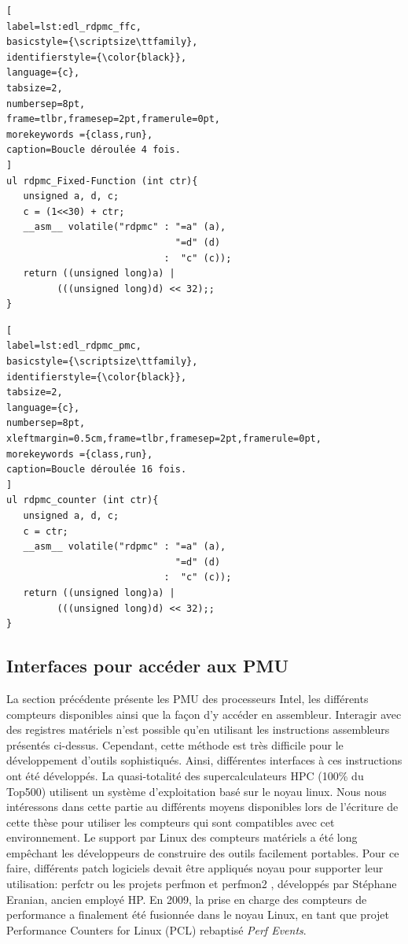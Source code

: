     
    

\begin{minipage}{.50\textwidth}
\begin{lstlisting}[
label=lst:edl_rdpmc_ffc,
basicstyle={\scriptsize\ttfamily},
identifierstyle={\color{black}},
language={c},
tabsize=2,
numbersep=8pt,
frame=tlbr,framesep=2pt,framerule=0pt,
morekeywords ={class,run},
caption=Boucle déroulée 4 fois.
]
ul rdpmc_Fixed-Function (int ctr){
   unsigned a, d, c;
   c = (1<<30) + ctr;
   __asm__ volatile("rdpmc" : "=a" (a), 
                              "=d" (d) 
                            :  "c" (c));
   return ((unsigned long)a) | 
         (((unsigned long)d) << 32);;
}
\end{lstlisting}
\end{minipage}%
\hfill
%
\begin{minipage}{.50\textwidth}
\begin{lstlisting}[
label=lst:edl_rdpmc_pmc,
basicstyle={\scriptsize\ttfamily},
identifierstyle={\color{black}},
tabsize=2,
language={c},
numbersep=8pt,
xleftmargin=0.5cm,frame=tlbr,framesep=2pt,framerule=0pt,
morekeywords ={class,run},
caption=Boucle déroulée 16 fois.
]
ul rdpmc_counter (int ctr){
   unsigned a, d, c;
   c = ctr;
   __asm__ volatile("rdpmc" : "=a" (a), 
                              "=d" (d) 
                            :  "c" (c));
   return ((unsigned long)a) | 
         (((unsigned long)d) << 32);;
}
\end{lstlisting}
\end{minipage}


\subsection{Interfaces pour accéder aux PMU}
    
    
    La section précédente présente les PMU des processeurs Intel, les différents compteurs disponibles ainsi que la façon d'y accéder en assembleur. Interagir avec des registres matériels n'est possible qu'en utilisant les instructions assembleurs présentés ci-dessus. Cependant, cette méthode est très difficile pour le développement d'outils sophistiqués. Ainsi, différentes interfaces à ces instructions ont été développés. La quasi-totalité des supercalculateurs HPC (100\% du Top500) utilisent un système d'exploitation basé sur le noyau linux. Nous nous intéressons dans cette partie au différents moyens disponibles lors de l'écriture de cette thèse pour utiliser les compteurs qui sont compatibles avec cet environnement. Le support par Linux des compteurs matériels a été long empêchant les développeurs de construire des outils facilement portables. Pour ce faire, différents patch logiciels devait être appliqués noyau pour supporter leur utilisation: perfctr \cite{Pettersson2005} ou les projets perfmon et perfmon2 \cite{Eranian2006}, développés par Stéphane Eranian, ancien employé HP. En 2009, la prise en charge des compteurs de performance a finalement été fusionnée dans le noyau Linux, en tant que projet Performance Counters for Linux (PCL) rebaptisé \textit{Perf Events}.

